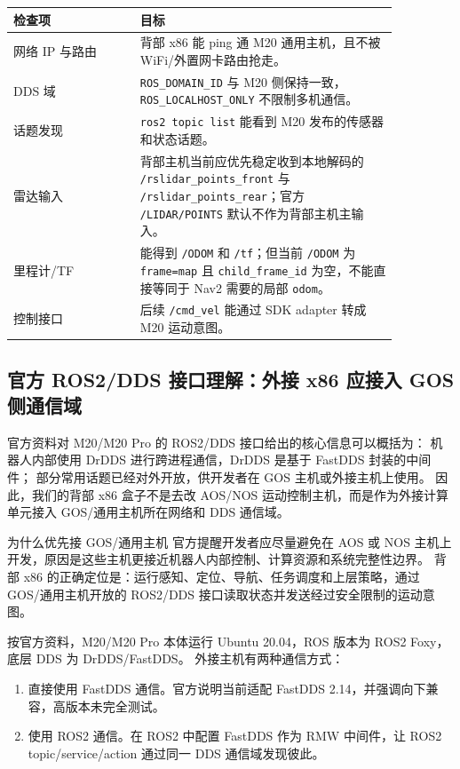 \documentclass[UTF8,11pt,a4paper]{ctexart}
\begin{document}
\begin{center}
\renewcommand{\arraystretch}{1.25}
\begin{tabular}{p{0.28\linewidth}p{0.58\linewidth}}
\toprule
\textbf{检查项} & \textbf{目标}\\
\midrule
网络 IP 与路由 & 背部 x86 能 ping 通 M20 通用主机，且不被 WiFi/外置网卡路由抢走。\\
DDS 域 & \texttt{ROS\_DOMAIN\_ID} 与 M20 侧保持一致，\texttt{ROS\_LOCALHOST\_ONLY} 不限制多机通信。\\
话题发现 & \texttt{ros2 topic list} 能看到 M20 发布的传感器和状态话题。\\
雷达输入 & 背部主机当前应优先稳定收到本地解码的 \texttt{/rslidar\_points\_front} 与 \texttt{/rslidar\_points\_rear}；官方 \texttt{/LIDAR/POINTS} 默认不作为背部主机主输入。\\
里程计/TF & 能得到 \texttt{/ODOM} 和 \texttt{/tf}；但当前 \texttt{/ODOM} 为 \texttt{frame=map} 且 \texttt{child\_frame\_id} 为空，不能直接等同于 Nav2 需要的局部 \texttt{odom}。\\
控制接口 & 后续 \texttt{/cmd\_vel} 能通过 SDK adapter 转成 M20 运动意图。\\
\bottomrule
\end{tabular}
\end{center}

\subsection{官方 ROS2/DDS 接口理解：外接 x86 应接入 GOS 侧通信域}

官方资料对 M20/M20 Pro 的 ROS2/DDS 接口给出的核心信息可以概括为：
机器人内部使用 DrDDS 进行跨进程通信，DrDDS 是基于 FastDDS 封装的中间件；
部分常用话题已经对外开放，供开发者在 GOS 主机或外接主机上使用。
因此，我们的背部 x86 盒子不是去改 AOS/NOS 运动控制主机，而是作为外接计算单元接入 GOS/通用主机所在网络和 DDS 通信域。

\begin{orangebox}{为什么优先接 GOS/通用主机}
官方提醒开发者应尽量避免在 AOS 或 NOS 主机上开发，原因是这些主机更接近机器人内部控制、计算资源和系统完整性边界。
背部 x86 的正确定位是：运行感知、定位、导航、任务调度和上层策略，通过 GOS/通用主机开放的 ROS2/DDS 接口读取状态并发送经过安全限制的运动意图。
\end{orangebox}

按官方资料，M20/M20 Pro 本体运行 Ubuntu 20.04，ROS 版本为 ROS2 Foxy，底层 DDS 为 DrDDS/FastDDS。
外接主机有两种通信方式：

\begin{enumerate}
  \item 直接使用 FastDDS 通信。官方说明当前适配 FastDDS 2.14，并强调向下兼容，高版本未完全测试。
  \item 使用 ROS2 通信。在 ROS2 中配置 FastDDS 作为 RMW 中间件，让 ROS2 topic/service/action 通过同一 DDS 通信域发现彼此。
\end{enumerate}
\end{document}
